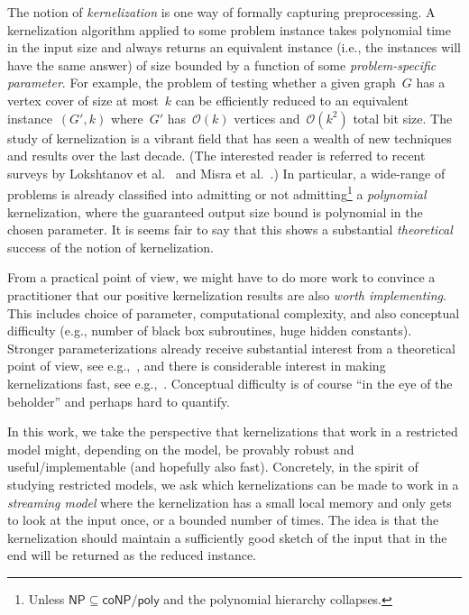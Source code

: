 \documentclass[draft,a4paper]{llncs}
\newcommand{\Oh}{\mathcal{O}}
\begin{document}
The notion of \emph{kernelization} is one way of formally capturing preprocessing. A kernelization algorithm applied to some problem instance takes polynomial time in the input size and always returns an equivalent instance (i.e., the instances will have the same answer) of size bounded by a function of some \emph{problem-specific parameter}. For example, the problem of testing whether a given graph~$G$ has a vertex cover of size at most~$k$ can be efficiently reduced to an equivalent instance~$(G',k)$ where~$G'$ has~$\Oh(k)$ vertices and~$\Oh(k^2)$ total bit size. The study of kernelization is a vibrant field that has seen a wealth of new techniques and results over the last decade. (The interested reader is referred to recent surveys by Lokshtanov et al.~\cite{LokshtanovMS12} and Misra et al.~\cite{MisraRS11}.) In particular, a wide-range of problems is already classified into admitting or not admitting\footnote{Unless $\mathsf{NP\subseteq coNP/poly}$ and the polynomial hierarchy collapses.} a \emph{
polynomial} kernelization, where the guaranteed output size bound is polynomial in the chosen parameter.
It is seems fair to say that this shows a substantial \emph{theoretical} success of the notion of kernelization.

From a practical point of view, we might have to do more work to convince a practitioner that our positive kernelization results are also \emph{worth implementing}. This includes choice of parameter, computational complexity, and also conceptual difficulty (e.g., number of black box subroutines, huge hidden constants). Stronger parameterizations already receive substantial interest from a theoretical point of view, see e.g.,~\cite{DBLP:journals/ejc/FellowsJR13}, and there is considerable interest in making kernelizations fast, see e.g.,~\cite{BevernHKNW11,Hagerup11,Bevern12,Kammer13}. Conceptual difficulty is of course ``in the eye of the beholder'' and perhaps hard to quantify.

In this work, we take the perspective that kernelizations that work in a restricted model might, depending on the model, be provably robust and useful/implementable (and hopefully also fast). Concretely, in the spirit of studying restricted models, we ask which kernelizations can be made to work in a \emph{streaming model} where the kernelization has a small local memory and only gets to look at the input once, or a bounded number of times. The idea is that the kernelization should maintain a sufficiently good sketch of the input that in the end will be returned as the reduced instance.
\end{document}
